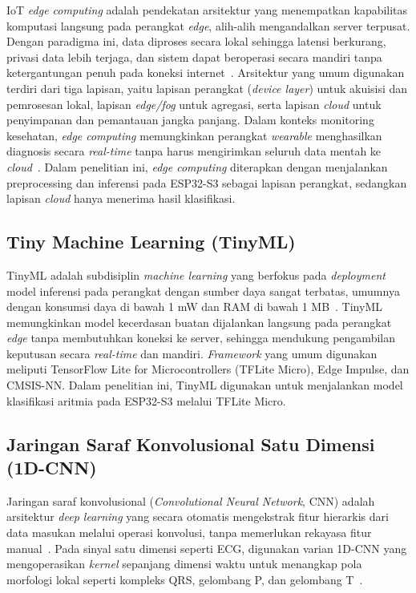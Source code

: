 IoT \textit{edge computing} adalah pendekatan arsitektur yang menempatkan kapabilitas komputasi langsung pada perangkat \textit{edge}, alih-alih mengandalkan server terpusat. Dengan paradigma ini, data diproses secara lokal sehingga latensi berkurang, privasi data lebih terjaga, dan sistem dapat beroperasi secara mandiri tanpa ketergantungan penuh pada koneksi internet~\cite{shi_2016}. Arsitektur yang umum digunakan terdiri dari tiga lapisan, yaitu lapisan perangkat (\textit{device layer}) untuk akuisisi dan pemrosesan lokal, lapisan \textit{edge/fog} untuk agregasi, serta lapisan \textit{cloud} untuk penyimpanan dan pemantauan jangka panjang. Dalam konteks monitoring kesehatan, \textit{edge computing} memungkinkan perangkat \textit{wearable} menghasilkan diagnosis secara \textit{real-time} tanpa harus mengirimkan seluruh data mentah ke \textit{cloud}~\cite{tinyml_iot_review}. Dalam penelitian ini, \textit{edge computing} diterapkan dengan menjalankan preprocessing dan inferensi pada ESP32-S3 sebagai lapisan perangkat, sedangkan lapisan \textit{cloud} hanya menerima hasil klasifikasi.

\subsection{Tiny Machine Learning (TinyML)}
\label{subsec:tinyml}

TinyML adalah subdisiplin \textit{machine learning} yang berfokus pada
\textit{deployment} model inferensi pada perangkat dengan sumber daya sangat
terbatas, umumnya dengan konsumsi daya di bawah 1 mW dan RAM di bawah
1 MB~\cite{tinyml_iot_review}. TinyML memungkinkan model kecerdasan buatan
dijalankan langsung pada perangkat \textit{edge} tanpa membutuhkan koneksi ke
server, sehingga mendukung pengambilan keputusan secara \textit{real-time} dan
mandiri. \textit{Framework} yang umum digunakan meliputi TensorFlow Lite for
Microcontrollers (TFLite Micro), Edge Impulse, dan CMSIS-NN. Dalam penelitian
ini, TinyML digunakan untuk menjalankan model klasifikasi aritmia pada ESP32-S3
melalui TFLite Micro.

\subsection{Jaringan Saraf Konvolusional Satu Dimensi (1D-CNN)}
\label{subsec:cnn-1d}

Jaringan saraf konvolusional (\textit{Convolutional Neural Network}, CNN)
adalah arsitektur \textit{deep learning} yang secara otomatis mengekstrak fitur
hierarkis dari data masukan melalui operasi konvolusi, tanpa memerlukan
rekayasa fitur manual~\cite{kim_2023}. Pada sinyal satu dimensi seperti ECG,
digunakan varian 1D-CNN yang mengoperasikan \textit{kernel} sepanjang dimensi
waktu untuk menangkap pola morfologi lokal seperti kompleks QRS, gelombang P,
dan gelombang T~\cite{kiranyaz_2016}.


